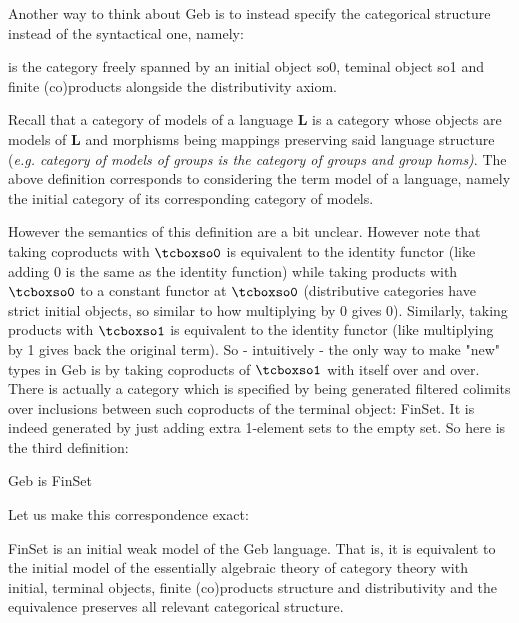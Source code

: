 Another way to think about Geb is to instead specify the categorical structure instead of the syntactical one, namely:
\begin{definition}
 is the category freely spanned by an initial object so0, teminal object so1 and finite (co)products alongside the distributivity axiom.
\end{definition}

Recall that a category of models of a language $\mathbf{L}$ is a category whose objects are models of $\mathbf{L}$ and morphisms being mappings preserving said language structure (\textit{e.g. category of models of groups is the category of groups and group homs)}. The above definition corresponds to considering the term model of a language, namely the initial category of its corresponding category of models.

However the semantics of this definition are a bit unclear. However note that taking coproducts with $\gebinit$ is equivalent to the identity functor (like adding 0 is the same as the identity function) while taking products with $\gebinit$ to a constant functor at $\gebinit$ (distributive categories have strict initial objects, so similar to how multiplying by 0 gives 0). Similarly, taking products with $\gebterm$ is equivalent to the identity functor (like multiplying by 1 gives back the original term). So - intuitively - the only way to make "new" types in Geb is by taking coproducts of $\gebterm$ with itself over and over. There is actually a category which is specified by being generated filtered colimits over inclusions between such coproducts of the terminal object: FinSet. It is indeed generated by just adding extra 1-element sets to the empty set. So here is the third definition:

\begin{definition}
Geb is FinSet
\end{definition}

Let us make this correspondence exact:

\begin{proposition}
FinSet is an initial weak model of the Geb language. That is, it is equivalent to the initial model of the essentially algebraic theory of category theory with initial, terminal objects, finite (co)products structure and distributivity and the equivalence preserves all relevant categorical structure.  
\end{proposition}


